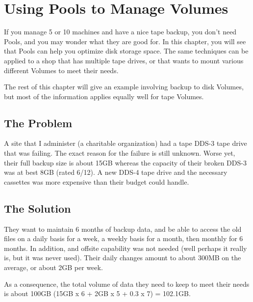 
\section*{Using Pools to Manage Volumes}
\label{_ChapterStart11}

If you manage 5 or 10 machines and have a nice tape backup, you don't need
Pools, and you may wonder what they are good for. In this chapter, you will
see that Pools can help you optimize disk storage space. The same techniques
can be applied to a shop that has multiple tape drives, or that wants to mount
various different Volumes to meet their needs. 

The rest of this chapter will give an example involving backup to disk
Volumes, but most of the information applies equally well for tape Volumes. 
\label{TheProblem}

\subsection*{The Problem}

A site that I administer (a charitable organization) had a tape DDS-3 tape
drive that was failing. The exact reason for the failure is still unknown.
Worse yet, their full backup size is about 15GB whereas the capacity of their
broken DDS-3 was at best 8GB (rated 6/12). A new DDS-4 tape drive and the
necessary cassettes was more expensive than their budget could handle. 
\label{TheSolution}

\subsection*{The Solution}

They want to maintain 6 months of backup data, and be able to access the old
files on a daily basis for a week, a weekly basis for a month, then monthly
for 6 months. In addition, and offsite capability was not needed (well perhaps
it really is, but it was never used). Their daily changes amount to about
300MB on the average, or about 2GB per week. 

As a consequence, the total volume of data they need to keep to meet their
needs is about 100GB (15GB x 6 + 2GB x 5 + 0.3 x 7) = 102.1GB. 

